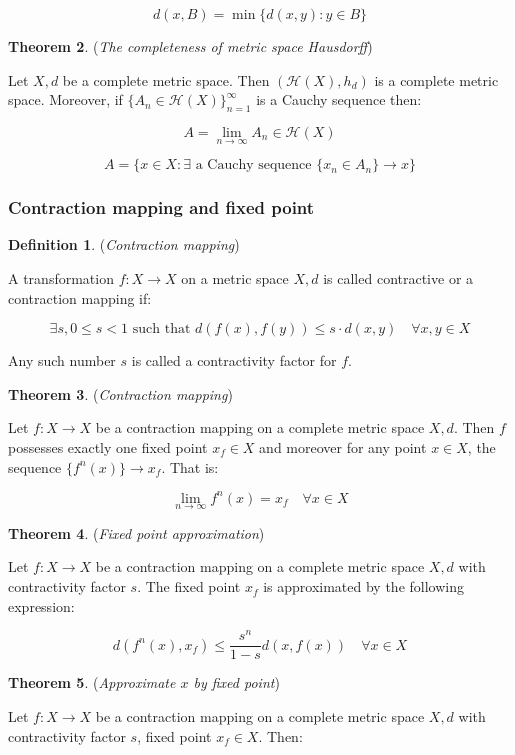 \[
d(x, B) = \min\{d(x, y) : y \in B\}
\]

\textbf{Theorem 2}. (\textit{The completeness of metric space Hausdorff})

Let \(X, d\) be a complete metric space. Then \((\mathcal{H}(X), h_d)\) is a complete metric space. Moreover, if \(\{A_n \in \mathcal{H}(X)\}_{n=1}^\infty\) is a Cauchy sequence then:

\[
A = \lim_{n \to \infty} A_n \in \mathcal{H}(X)
\]

\[
A = \{x \in X : \exists \text{ a Cauchy sequence } \{x_n \in A_n\} \rightarrow x\}
\]

\pagebreak
\subsubsection{Contraction mapping and fixed point}

\textbf{Definition 1}. (\textit{Contraction mapping})

A transformation \(f: X \rightarrow X\) on a metric space \(X, d\) is called contractive or a contraction mapping if:

\[
\exists s, 0 \leq s < 1 \text{ such that } d(f(x), f(y)) \leq s \cdot d(x, y) \quad \forall x, y \in X
\]

Any such number \(s\) is called a contractivity factor for \(f\).

\textbf{Theorem 3}. (\textit{Contraction mapping})

Let \(f: X \rightarrow X\) be a contraction mapping on a complete metric space \(X, d\). Then \(f\) possesses exactly one fixed point \(x_f \in X\) and moreover for any point \(x \in X\), the sequence \(\{f^n(x)\} \rightarrow x_f\). That is:

\[
\lim_{n \to \infty} f^n(x) = x_f \quad \forall x \in X
\]

\textbf{Theorem 4}. (\textit{Fixed point approximation})

Let \(f: X \rightarrow X\) be a contraction mapping on a complete metric space \(X, d\) with contractivity factor \(s\). The fixed point \(x_f\) is approximated by the following expression:

\[
d(f^n(x), x_f) \leq \frac{s^n}{1 - s} d(x, f(x)) \quad \forall x \in X
\]

\textbf{Theorem 5}. (\textit{Approximate \(x\) by fixed point})

Let \(f: X \rightarrow X\) be a contraction mapping on a complete metric space \(X, d\) with contractivity factor \(s\), fixed point \(x_f \in X\). Then:


